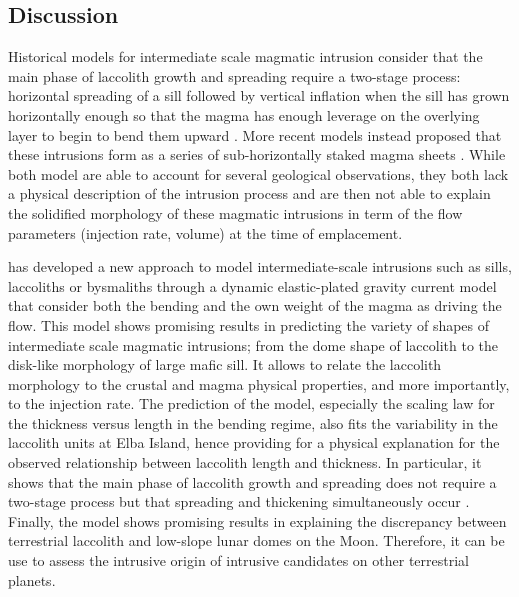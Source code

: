 \subsection{Discussion}
\label{C2-sec:discussion-1}

Historical models  for intermediate scale magmatic  intrusion consider
that  the main  phase  of  laccolith growth  and  spreading require  a
two-stage process: horizontal spreading of a sill followed by vertical
inflation  when the  sill has  grown horizontally  enough so  that the
magma has enough leverage on the overlying layer to begin to bend them
upward \citep{Johnson:1973ho,Koch:1981if}.  More recent models instead
proposed that  these intrusions form  as a series  of sub-horizontally
staked magma  sheets \citep{Morgan:2008hj,Menand:2011ki}.   While both
model are  able to account  for several geological  observations, they
both lack a physical description of the intrusion process and are then
not  able  to explain  the  solidified  morphology of  these  magmatic
intrusions in term of the  flow parameters (injection rate, volume) at
the time of emplacement.

\citet{Michaut:2011kg}  has   developed  a   new  approach   to  model
intermediate-scale intrusions such as  sills, laccoliths or bysmaliths
through a  dynamic elastic-plated gravity current  model that consider
both the bending and the own weight  of the magma as driving the flow.
This model shows promising results in predicting the variety of shapes
of  intermediate scale  magmatic intrusions;  from the  dome shape  of
laccolith to the disk-like morphology  of large mafic sill.  It allows
to relate the  laccolith morphology to the crustal  and magma physical
properties,  and  more  importantly,   to  the  injection  rate.   The
prediction of the model, especially  the scaling law for the thickness
versus length in the bending regime,  also fits the variability in the
laccolith  units  at  Elba  Island, hence  providing  for  a  physical
explanation for the observed relationship between laccolith length and
thickness. In  particular, it shows  that the main phase  of laccolith
growth and  spreading does  not require a  two-stage process  but that
spreading and thickening  simultaneously occur \citep{Michaut:2011kg}.
Finally,  the   model  shows  promising  results   in  explaining  the
discrepancy between terrestrial laccolith and low-slope lunar domes on
the Moon. Therefore,  it can be use to assess  the intrusive origin of
intrusive candidates on other terrestrial planets.

